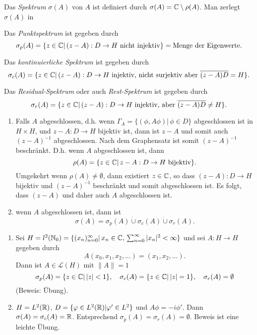 \documentclass{mycourse}
\begin{document}
Das \emph{Spektrum} $\sigma(A)$ von $A$ ist definiert durch $\sigma(A)=\mathbb{C}\setminus \rho(A)$. Man zerlegt $\sigma(A)$ in
\begin{seg}[Punktsprektum]
Das \emph{Punktspektrum} ist gegeben durch
\[
\sigma_p(A)=\{z\in \mathbb{C} |\, (z-A): D\to H \text{ nicht injektiv}\}= \text{Menge der Eigenwerte.}
\]
\end{seg}
\begin{seg}
Das \emph{kontinuierliche Spektrum} ist gegeben durch
\[
\sigma_c(A)=\{z\in \mathbb{C}|\, (z-A): D\to H \text{ injektiv, nicht surjektiv aber } \overline{(z-A)D}= H\}.
\]
\end{seg}
\begin{seg}
Das \emph{Residual-Spektrum} oder auch \emph{Rest-Spektrum} ist gegeben durch
\[
\sigma_r(A)=\{z\in \mathbb{C}|\, (z-A):D \to H \text{ injektiv, aber } \overline{(z-A)D}\neq H\}.
\]
\end{seg}
\begin{nt*}
\begin{enumerate}[1)]
\item Falls $A$ abgeschlossen, d.h. wenn $\Gamma_A= \{(\phi, A\phi)|\, \phi \in D\}$ abgeschlossen ist in $H\times H$, und $z-A: D \to H$ bijektiv ist, dann ist $z-A$ und somit auch $(z-A)^{-1}$ abgeschlossen. Nach dem Graphensatz ist somit $(z-A)^{-1}$ beschränkt. D.h. wenn $A$ abgeschlossen ist, dann 
\[
\rho(A)=\{z\in \mathbb{C}|\, z-A: D \to H \text{ bijektiv}\}.
\]
Umgekehrt wenn $\rho(A)\neq \emptyset$, dann existiert $z\in \mathbb{C}$, so dass $(z-A):D\to H$ bijektiv und $(z-A)^{-1}$ beschränkt und somit abgeschlossen ist. Es folgt, dass $(z-A)$ und daher auch $A$ abgeschlossen ist.
\item wenn $A$ abgeschlossen ist, dann ist
\[
\sigma(A)=\sigma_p(A) \dot\cup \sigma_c(A) \dot\cup \sigma_r(A).
\]
\end{enumerate}
\end{nt*}
\begin{ex*}
\begin{enumerate}[1)]
\item Sei $H= l^2(\mathbb{N}_0)=\{(x_n)_{n=0}^\infty |\, x_n \in \mathbb{C},\, \sum_{n=0}^\infty|x_n|^2<\infty\}$ und sei $A: H\to H$ gegeben durch 
\[
A(x_0, x_1, x_2,...)=(x_1, x_2,...).
\]
Dann ist $A\in \mathcal L(H)$ mit $\|A\|=1$
\[
\sigma_p(A)=\{z\in \mathbb{C}|\, |z|<1\}, \quad \sigma_c(A)=\{z\in \mathbb{C}|\, |z|=1\}, \quad \sigma_r(A)=\emptyset
\]
(Beweis: Übung).
\item $H=L^2(\mathbb{R})$, $D=\{\varphi\in L^2(\mathbb{R})| \varphi'\in L^2\}$ und $A\phi=-i \phi'$. Dann $\sigma(A)=\sigma_c(A)=\mathbb{R}$. Entsprechend $\sigma_p(A)=\sigma_r(A)= \emptyset$. Beweis ist eine leichte Übung.
\end{enumerate}
\end{ex*}
\end{document}
